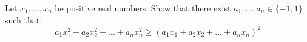 Let $x_1,\ldots ,x_n$ be positive real numbers. Show that there exist $a_1,\ldots ,a_n\in\{-1,1\}$ such that:\[a_1x_1^2+a_2x_2^2+\ldots +a_nx_n^2\ge (a_1x_1+a_2x_2+\ldots + a_n x_n)^2\]